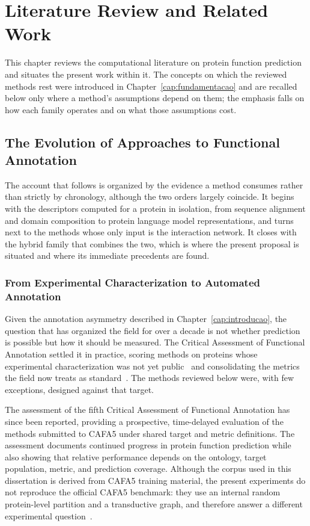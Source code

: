 \documentclass[Ingles]{ic-tese-v3}
\begin{document}
\chapter{Literature Review and Related Work}
\label{cap:trabalhos}

This chapter reviews the computational literature on protein function prediction and situates the
present work within it. The concepts on which the reviewed methods rest were introduced in
Chapter~\ref{cap:fundamentacao} and are recalled below only where a method's assumptions depend on them;
the emphasis falls on how each family operates and on what those assumptions cost.

\section{The Evolution of Approaches to Functional Annotation}
\label{sec:rel_evolucao}

The account that follows is organized by the evidence a method consumes rather than strictly by
chronology, although the two orders largely coincide. It begins with the descriptors computed for a
protein in isolation, from sequence alignment and domain composition to protein language model
representations, and turns next to the methods whose only input is the interaction network. It closes
with the hybrid family that combines the two, which is where the present proposal is situated and
where its immediate precedents are found.

\subsection{From Experimental Characterization to Automated Annotation}
\label{sec:rel_classicos}

Given the annotation asymmetry described in Chapter~\ref{cap:introducao}, the question that has organized
the field for over a decade is not whether prediction is possible but how it should be measured. The
Critical Assessment of Functional Annotation settled it in practice, scoring methods on proteins
whose experimental characterization was not yet public~\cite{radivojac2013large} and consolidating
the metrics the field now treats as standard~\cite{zhou_cafa_2019}. The methods reviewed below were,
with few exceptions, designed against that target.

The assessment of the fifth Critical Assessment of Functional Annotation has since been reported, providing a prospective, time-delayed evaluation of the methods submitted to CAFA5 under shared target and metric definitions. The assessment documents continued progress in protein function prediction while also showing that relative performance depends on the ontology, target population, metric, and prediction coverage. Although the corpus used in this dissertation is derived from CAFA5 training material, the present experiments do not reproduce the official CAFA5 benchmark: they use an internal random protein-level partition and a transductive graph, and therefore answer a different experimental question~\cite{depaoliskaluza2026cafa5}.
\end{document}
